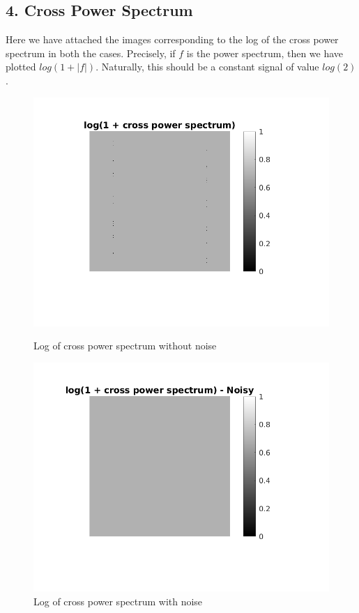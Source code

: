 \documentclass[12pt, a4paper]{article}
\begin{document}
\subsection*{4. Cross Power Spectrum}
Here we have attached the images corresponding to the log of the cross power spectrum in both the cases. Precisely, if $f$ is the power spectrum, then we have plotted $log(1+ |f|)$. Naturally, this should be a constant signal of value $log(2)$.
\begin{figure}[h!]
    \centering
    \renewcommand{\thefigure}{5.3 (a)}
    \begin{minipage}[c][1\width]{0.6\textwidth}
    	\includegraphics[width=1\textwidth]{log_fft_noiseless.png}
    	\vspace*{-60pt}
    	\caption{Log of cross power spectrum without noise}
	    \label{fig:5.3.a}
    \end{minipage}
    \renewcommand{\thefigure}{5.3 (b)}
    \begin{minipage}[c][1\width]{0.6\textwidth}
    	\includegraphics[width=1\textwidth]{log_fft_noisy.png}
    	\vspace*{-60pt}
    	\caption{Log of cross power spectrum with noise}
	    \label{fig:5.3.b}
    \end{minipage}
\end{figure}
\vspace*{40pt}
\end{document}
